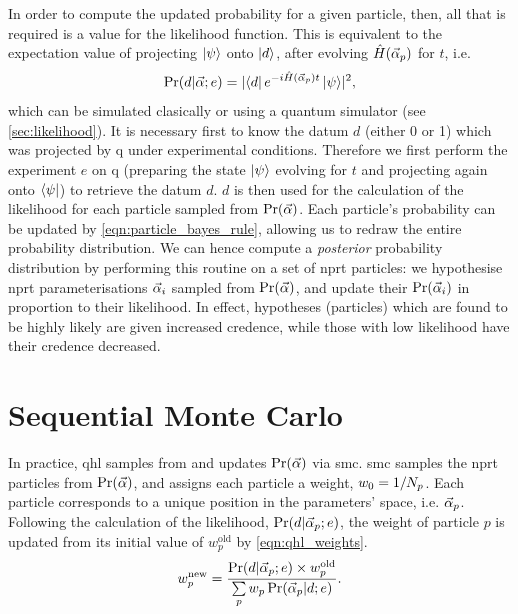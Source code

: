 In order to compute the updated probability for a given particle, then, all that is required is a value for the \gls{likelihood} function.
This is equivalent to the \gls{expectation value} of projecting $\ket{\psi}$ onto $\ket{d}$, after evolving $\hat{H}(\vec{\alpha}_p)$ for $t$, i.e. 
\begin{equation}
\label{eqn:likelihood}
\Pr(d | \vec{\alpha}; e) = \lvert \bra{d} e^{-i \hat{H}(\vec{\alpha}_p)t} \ket{\psi} \rvert^2,   
\end{equation}
which can be simulated clasically or using a quantum simulator (see \cref{sec:likelihood}). 
It is necessary first to know the datum $d$ (either 0 or 1) which was projected by \gls{q} under experimental conditions. 
Therefore we first perform the \gls{experiment} $e$ on \gls{q} 
(preparing the state $\ket{\psi}$ evolving for $t$ and projecting again onto $\bra{\psi}$)
to retrieve the datum $d$. 
$d$ is then used for the calculation of the \gls{likelihood} for each \gls{particle} sampled from $\Pr({\vec{\alpha}})$. 
Each particle's probability can be updated by \cref{eqn:particle_bayes_rule}, 
allowing us to redraw the entire probability distribution.
We can hence compute a \emph{posterior} probability distribution
by performing this routine on a set of \gls{nprt} \glspl{particle}:
we hypothesise \gls{nprt} parameterisations $\vec{\alpha}_i$ sampled from $\Pr(\vec{\alpha})$, 
and update their $\Pr(\vec{\alpha}_i)$ in proportion to their likelihood.
In effect, hypotheses (\glspl{particle}) which are found to be highly likely are given increased credence, 
while those with low likelihood have their credence decreased. 

\section{Sequential Monte Carlo}\label{sec:smc}
In practice, \gls{qhl} samples from and updates $\Pr(\vec{\alpha})$  via \gls{smc}.
\gls{smc} samples the \gls{nprt} \glspl{particle} from $\Pr(\vec{\alpha})$, and assigns each \gls{particle} a weight, $w_0 = 1/N_p$.
Each \gls{particle} corresponds to a unique position in the parameters' space, i.e. $\vec{\alpha}_p$.
Following the calculation of the likelihood, $\Pr(d | \vec{\alpha}_p; e)$, 
the weight of \gls{particle} $p$ is updated from its initial value of $w_p^{\textrm{old}}$ by \cref{eqn:qhl_weights}.
\begin{equation}\label{eqn:qhl_weights}
w_p^{\textrm{new}} = \frac{\Pr(d | \vec{\alpha}_p; e) \times w_p^{\textrm{old}} } { \sum\limits_{p} w_p \Pr(\vec{\alpha}_p | d; e) }.
\end{equation}

